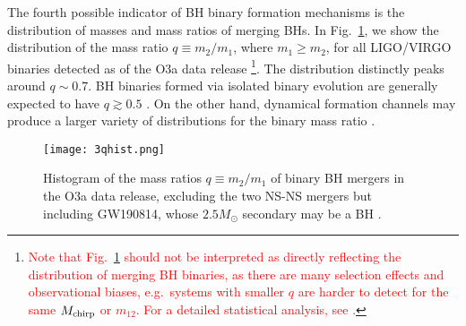 \documentclass[
        fleqn,
        usenatbib,
    ]{mnras}
\begin{document}
The fourth possible indicator of BH binary formation mechanisms is the
distribution of masses and mass ratios of merging BHs. In Fig.~\ref{fig:qhist},
we show the distribution of the mass ratio $q \equiv m_2 / m_1$, where $m_1 \geq
m_2$, for all LIGO/VIRGO binaries detected as of the O3a data release
\citep{LIGOO3a}\footnote{\textcolor{red}{Note that Fig.~\ref{fig:qhist} should
not be interpreted as directly reflecting the distribution of merging BH
binaries, as there are many selection effects and observational biases, e.g.\
systems with smaller $q$ are harder to detect for the same $M_{\rm chirp}$ or
$m_{12}$. For a detailed statistical analysis, see \citet{LIGOO3a}.}}. The
distribution distinctly peaks around $q \sim 0.7$. BH binaries formed via
isolated binary evolution are generally expected to have $q \gtrsim 0.5$
\citep{belczynski2016first, olejak2020}. On the other hand, dynamical formation
channels may produce a larger variety of distributions for the binary mass ratio
\citep[e.g.,][]{rodriguez2016binary, silsbee2017lidov, fragione2019}.

\begin{figure}
    \centering
    \texttt{[image: 3qhist.png]}
    \caption{Histogram of the mass ratios $q \equiv m_2 / m_1$ of binary BH
    mergers in the O3a data release, excluding the two NS-NS mergers but including
    GW190814, whose $2.5M_{\odot}$ secondary may be a BH \citep{LIGOO3a}.
    }\label{fig:qhist}
\end{figure}
\end{document}
